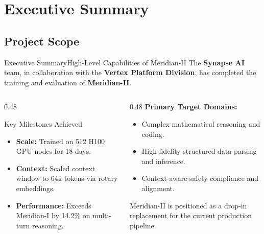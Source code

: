 \section{Executive Summary}
\subsection{Project Scope}

\begin{frame}{Executive Summary}{High-Level Capabilities of Meridian-II}
  The \textbf{Synapse AI} team, in collaboration with the \textbf{Vertex Platform Division}, has completed the training and evaluation of \textbf{Meridian-II}.
  
  \vspace{0.3cm}
  \begin{columns}[T]
    \begin{column}{0.48\textwidth}
      \begin{successbox}{Key Milestones Achieved}
        \begin{itemize}
          \item \textbf{Scale:} Trained on 512 H100 GPU nodes for 18 days.
          \item \textbf{Context:} Scaled context window to 64k tokens via rotary embeddings.
          \item \textbf{Performance:} Exceeds Meridian-I by 14.2\% on multi-turn reasoning.
        \end{itemize}
      \end{successbox}
    \end{column}
    \hfill
    \begin{column}{0.48\textwidth}
      \textbf{Primary Target Domains:}
      \begin{itemize}
        \item Complex mathematical reasoning and coding.
        \item High-fidelity structured data parsing and inference.
        \item Context-aware safety compliance and alignment.
      \end{itemize}
      \vspace{0.2cm}
      \color{textMuted}\small
      Meridian-II is positioned as a drop-in replacement for the current production pipeline.
    \end{column}
  \end{columns}
\end{frame}
